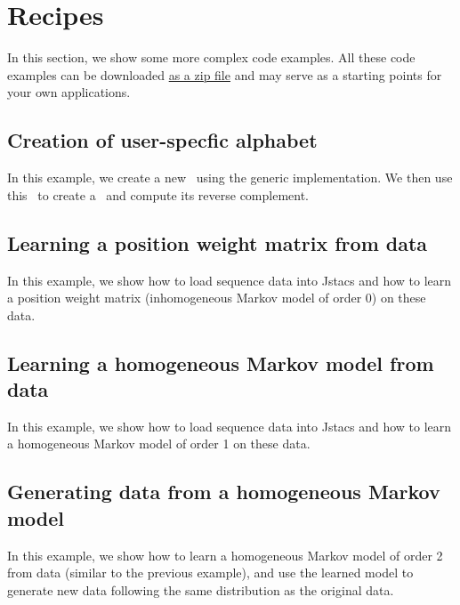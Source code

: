 \section{Recipes}\label{recipes}


In this section, we show some more complex code examples. All these code examples can be downloaded \href{http://www.jstacs.de/downloads/recipes.zip}{as a zip file} and may serve as a starting points for your own applications.

\subsection{Creation of user-specfic alphabet}
In this example, we create a new \ComplementableDiscreteAlphabet~using the generic implementation. We then use this \Alphabet~to create a \Sequence~and compute its reverse complement.
\renewcommand{\codefile}{./recipes/AlphabetCreation.java}
\setcounter{off}{33}

\subsection{Learning a position weight matrix from data}
In this example, we show how to load sequence data into Jstacs and how to learn a position weight matrix (inhomogeneous Markov model of order 0) on these data.
\renewcommand{\codefile}{./recipes/TrainPWM.java}
\setcounter{off}{36}

\subsection{Learning a homogeneous Markov model from data}
In this example, we show how to load sequence data into Jstacs and how to learn a homogeneous Markov model of order 1 on these data.
\renewcommand{\codefile}{./recipes/TrainHomogeneousMM.java}
\setcounter{off}{35}

\subsection{Generating data from a homogeneous Markov model}
In this example, we show how to learn a homogeneous Markov model of order 2 from data (similar to the previous example), and use the learned model to generate new data following the same distribution as the original data.
\renewcommand{\codefile}{./recipes/GenerateData.java}
\setcounter{off}{39}

